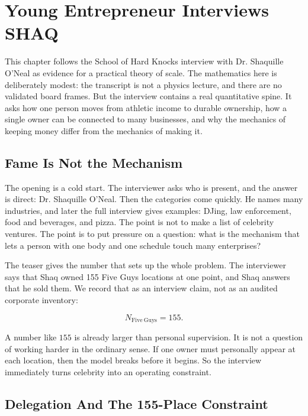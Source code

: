 \chapter{Young Entrepreneur Interviews SHAQ}

This chapter follows the School of Hard Knocks interview with Dr. Shaquille O'Neal as evidence for a practical theory of scale. The mathematics here is deliberately modest: the transcript is not a physics lecture, and there are no validated board frames. But the interview contains a real quantitative spine. It asks how one person moves from athletic income to durable ownership, how a single owner can be connected to many businesses, and why the mechanics of keeping money differ from the mechanics of making it.

\section{Fame Is Not the Mechanism}

The opening is a cold start. The interviewer asks who is present, and the answer is direct: Dr. Shaquille O'Neal. Then the categories come quickly. He names many industries, and later the full interview gives examples: DJing, law enforcement, food and beverages, and pizza. The point is not to make a list of celebrity ventures. The point is to put pressure on a question: what is the mechanism that lets a person with one body and one schedule touch many enterprises?

The teaser gives the number that sets up the whole problem. The interviewer says that Shaq owned 155 Five Guys locations at one point, and Shaq answers that he sold them. We record that as an interview claim, not as an audited corporate inventory:

\begin{equation}
N_{\mathrm{Five\ Guys}} = 155.
\end{equation}

A number like \(155\) is already larger than personal supervision. It is not a question of working harder in the ordinary sense. If one owner must personally appear at each location, then the model breaks before it begins. So the interview immediately turns celebrity into an operating constraint.

\section{Delegation And The 155-Place Constraint}

